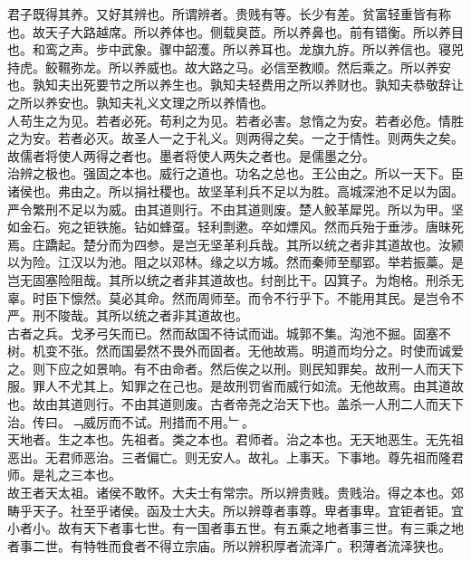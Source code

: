 \documentclass{zhvt-classic}
\begin{document}
\hspace*{2em}君子既得其养。又好其辨也。所谓辨者。贵贱有等。长少有差。贫富轻重皆有称也。故天子大路越席。所以养体也。侧载臭茝。所以养鼻也。前有错衡。所以养目也。和鸾之声。步中武象。骤中韶濩。所以养耳也。龙旗九斿。所以养信也。寝兕持虎。鲛韅弥龙。所以养威也。故大路之马。必信至教顺。然后乘之。所以养安也。孰知夫出死要节之所以养生也。孰知夫轻费用之所以养财也。孰知夫恭敬辞让之所以养安也。孰知夫礼义文理之所以养情也。\\
\hspace*{2em}人苟生之为见。若者必死。苟利之为见。若者必害。怠惰之为安。若者必危。情胜之为安。若者必灭。故圣人一之于礼义。则两得之矣。一之于情性。则两失之矣。故儒者将使人两得之者也。墨者将使人两失之者也。是儒墨之分。\\
\hspace*{2em}治辨之极也。强固之本也。威行之道也。功名之总也。王公由之。所以一天下。臣诸侯也。弗由之。所以捐社稷也。故坚革利兵不足以为胜。高城深池不足以为固。严令繁刑不足以为威。由其道则行。不由其道则废。楚人鲛革犀兕。所以为甲。坚如金石。宛之钜铁施。钻如蜂虿。轻利剽遬。卒如熛风。然而兵殆于垂涉。唐昧死焉。庄蹻起。楚分而为四参。是岂无坚革利兵哉。其所以统之者非其道故也。汝颍以为险。江汉以为池。阻之以邓林。缘之以方城。然而秦师至鄢郢。举若振藁。是岂无固塞险阻哉。其所以统之者非其道故也。纣剖比干。囚箕子。为炮格。刑杀无辜。时臣下懔然。莫必其命。然而周师至。而令不行乎下。不能用其民。是岂令不严。刑不陖哉。其所以统之者非其道故也。\\
\hspace*{2em}古者之兵。戈矛弓矢而已。然而敌国不待试而诎。城郭不集。沟池不掘。固塞不树。机变不张。然而国晏然不畏外而固者。无他故焉。明道而均分之。时使而诚爱之。则下应之如景响。有不由命者。然后俟之以刑。则民知罪矣。故刑一人而天下服。罪人不尤其上。知罪之在己也。是故刑罚省而威行如流。无他故焉。由其道故也。故由其道则行。不由其道则废。古者帝尧之治天下也。盖杀一人刑二人而天下治。传曰。﹁威厉而不试。刑措而不用。﹂。\\
\hspace*{2em}天地者。生之本也。先祖者。类之本也。君师者。治之本也。无天地恶生。无先祖恶出。无君师恶治。三者偏亡。则无安人。故礼。上事天。下事地。尊先祖而隆君师。是礼之三本也。\\
\hspace*{2em}故王者天太祖。诸侯不敢怀。大夫士有常宗。所以辨贵贱。贵贱治。得之本也。郊畴乎天子。社至乎诸侯。函及士大夫。所以辨尊者事尊。卑者事卑。宜钜者钜。宜小者小。故有天下者事七世。有一国者事五世。有五乘之地者事三世。有三乘之地者事二世。有特牲而食者不得立宗庙。所以辨积厚者流泽广。积薄者流泽狭也。\\
\end{document}
